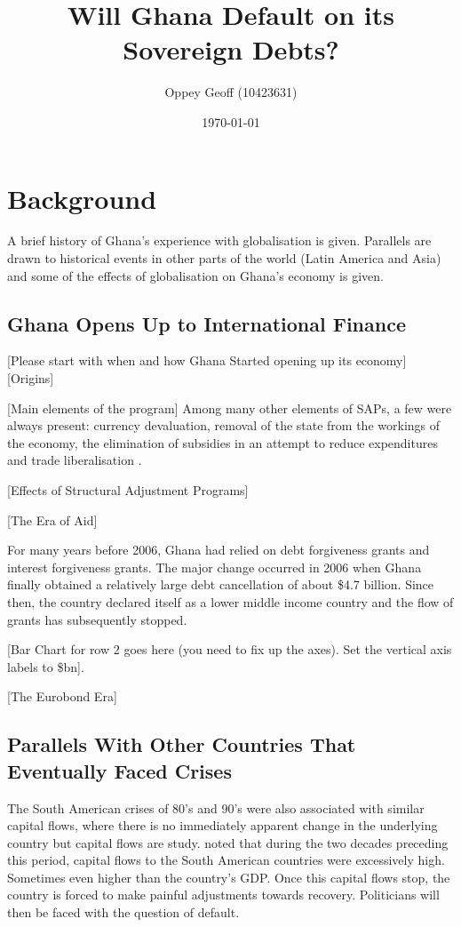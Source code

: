 \documentclass[a4paper, 12pt]{article}
\author{Oppey Geoff (10423631)}
\title{Will Ghana Default on its Sovereign Debts?}
\date{\today}
\begin{document}
	\maketitle
	\clearpage
	\tableofcontents
	\newpage
	\doublespacing

	\section{Background}
	A brief history of Ghana's experience with globalisation is given. Parallels are drawn to historical events in other parts of the world (Latin America and Asia) and some of the effects of globalisation on Ghana's economy is given.
	
	\subsection{Ghana Opens Up to International Finance}
	[Please start with when and how Ghana Started opening up its economy]\\
	
	[Origins]
	\cite{ThingsFallAp}
	\cite{hutchful1989revolution}
	
	[Main elements of the program]
	Among many other elements of SAPs, a few were always present: currency devaluation, removal of the state from the workings of the economy, the elimination of subsidies in an attempt to reduce expenditures and trade liberalisation \cite{ThingsFallAp}. 
	
	\cite{World}
	\cite{AssessingAdju}
	
	
	[Effects of Structural Adjustment Programs]
	\cite{StructuralAdj_1}
	\cite{StructuralAdj}
	\cite{okoroafo1993imf}
	\cite{Backtothefu}
	
	[The Era of Aid]
	\cite{tsikata1999aid}
	\cite{Foreignaidd}
	\cite{Tradeopenness}
	\cite{Riddell09}
	
	For many years before 2006, Ghana had relied on debt forgiveness grants and interest forgiveness grants. The major change occurred in 2006 when Ghana finally obtained a relatively large debt cancellation of about \$4.7 billion. Since then, the country declared itself as a lower middle income country and the flow of grants has subsequently stopped.
	
	[Bar Chart for row 2 goes here (you need to fix up the axes). Set the vertical axis labels to \$bn].
	
	
	[The Eurobond Era]
	
	\subsection{Parallels With Other Countries That Eventually Faced Crises}
	The South American crises of 80's and 90's were also associated with similar capital flows, where there is no immediately apparent change in the underlying country but capital flows are study.  noted that during the two decades preceding this period, capital flows to the South American countries were excessively high. Sometimes even higher than the country's GDP. Once this capital flows stop, the country is forced to make painful adjustments towards recovery. Politicians will then be faced with the question of default. 
\end{document}
